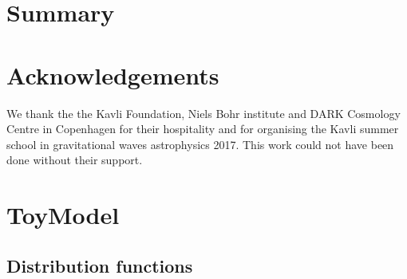 \documentclass[a4paper,fleqn,usenatbib]{mnras}
\begin{document}
\section{Summary }






\section*{Acknowledgements}

We thank the the Kavli Foundation, Niels Bohr institute and DARK Cosmology Centre in Copenhagen for their hospitality and for organising the Kavli summer school in gravitational waves astrophysics 2017. This work could not have been done without their support. 



\newpage 







\appendix





\section{ToyModel}


\subsection{Distribution functions}
\end{document}
